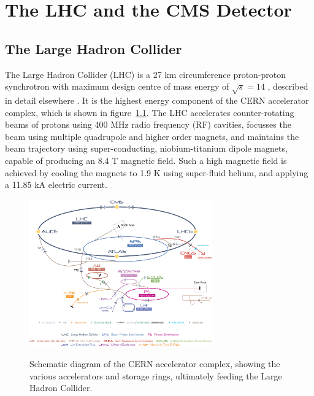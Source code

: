 \chapter{The LHC and the CMS Detector}

\ifpdf
    \graphicspath{{Chapter3/Figs/Raster/}{Chapter3/Figs/PDF/}{Chapter3/Figs/}}
\else
    \graphicspath{{Chapter3/Figs/Vector/}{Chapter3/Figs/}}
\fi


\section{The Large Hadron Collider}  %
\label{sec:detector_lhc}

The Large Hadron Collider (LHC) is a 27 km circumference proton-proton 
synchrotron with maximum design centre of mass energy of
$\sqrt{s} = 14$ \tev, described in detail elsewhere \cite{Evans:2008zzb}. It
is the highest energy component of the CERN accelerator
complex, which is shown in figure~\ref{fig:cern_acc_complex}. The LHC
accelerates counter-rotating beams of protons using 400 MHz radio frequency
(RF) cavities, focusses the beam using multiple quadrupole and higher order magnets,
and maintains the beam trajectory using super-conducting, niobium-titanium 
dipole magnets, capable of producing an 8.4 T magnetic field. Such a high 
magnetic field is achieved by cooling the magnets to 1.9 K using super-fluid 
helium, and applying a 11.85 kA electric current.

\begin{figure}[hb!]
\centering
\includegraphics[width=0.7\textwidth]{Figs/machine/Cern-Accelerator-Complex.jpg}
\label{fig:cern_acc_complex}
\caption{Schematic diagram of the CERN accelerator complex, showing the various 
accelerators and storage rings, ultimately feeding the Large Hadron Collider.}
\end{figure}

